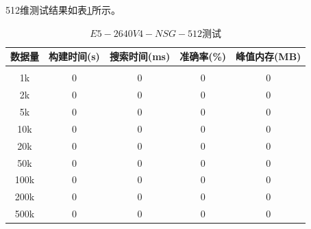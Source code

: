 \documentclass[a4paper, 11pt, UTF8]{ctexart}%
\begin{document}
512维测试结果如表\ref{tab:E5-2640V4-NSG-512}所示。
\begin{table}[H]
\caption{$E5-2640V4-NSG-512$测试}
\label{tab:E5-2640V4-NSG-512}
\begin{center}
\begin{tabular}{ccccc}
\multicolumn{1}{c}{\bf 数据量}  &\multicolumn{1}{c}{\bf 构建时间(s)}  &\multicolumn{1}{c}{\bf 搜索时间(ms)}  &\multicolumn{1}{c}{\bf 准确率(\%)}  &\multicolumn{1}{c}{\bf 峰值内存(MB)}
\\ \hline \\
1k & 0 & 0 & 0 & 0\\
2k & 0 & 0 & 0 & 0\\
5k & 0 & 0 & 0 & 0\\
10k & 0 & 0 & 0 & 0\\
20k & 0 & 0 & 0 & 0\\
50k & 0 & 0 & 0 & 0\\
100k & 0 & 0 & 0 & 0\\
200k & 0 & 0 & 0 & 0\\
500k & 0 & 0 & 0 & 0\\
\end{tabular}
\end{center}
\end{table}
\end{document}
